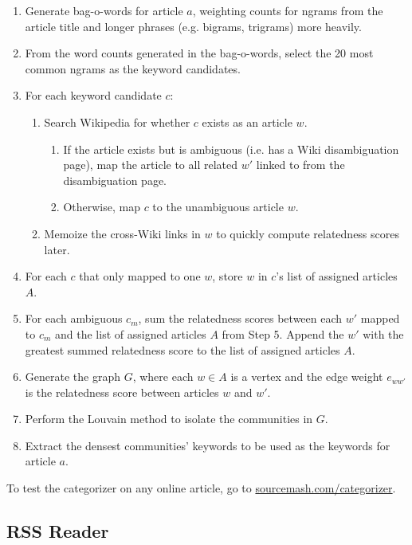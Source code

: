 \documentclass[11pt]{article}
\begin{document}
\begin{enumerate}

\item Generate bag-o-words for article $a$, weighting counts for ngrams from the article title and longer phrases (e.g. bigrams, trigrams) more heavily.
\item From the word counts generated in the bag-o-words, select the 20 most common ngrams as the keyword candidates.
\item For each keyword candidate $c$:
  \begin{enumerate}
  	\item Search Wikipedia for whether $c$ exists as an article $w$.
  	\begin{enumerate}
 		 \item If the article exists but is ambiguous (i.e. has a Wiki disambiguation page), map the article to all related $w'$ linked to from the disambiguation page.
  		\item Otherwise, map $c$ to the unambiguous article $w$.
  	\end{enumerate}
	\item Memoize the cross-Wiki links in $w$ to quickly compute relatedness scores later.
  \end{enumerate}
\item For each $c$ that only mapped to one $w$, store $w$ in $c$'s list of assigned articles $A$.
\item For each ambiguous $c_{m}$, sum the relatedness scores between each $w'$ mapped to $c_m$ and the list of assigned articles $A$ from Step 5. Append the $w'$ with the greatest summed relatedness score to the list of assigned articles $A$.
\item Generate the graph $G$, where each $w \in A$ is a vertex and the edge weight $e_{ww'}$ is the relatedness score between articles $w$ and $w'$.
\item Perform the Louvain method to isolate the communities in $G$.
\item Extract the densest communities' keywords to be used as the keywords for article $a$.
\end{enumerate}

To test the categorizer on any online article, go to \url{sourcemash.com/categorizer}.

\subsection{RSS Reader}
\end{document}
